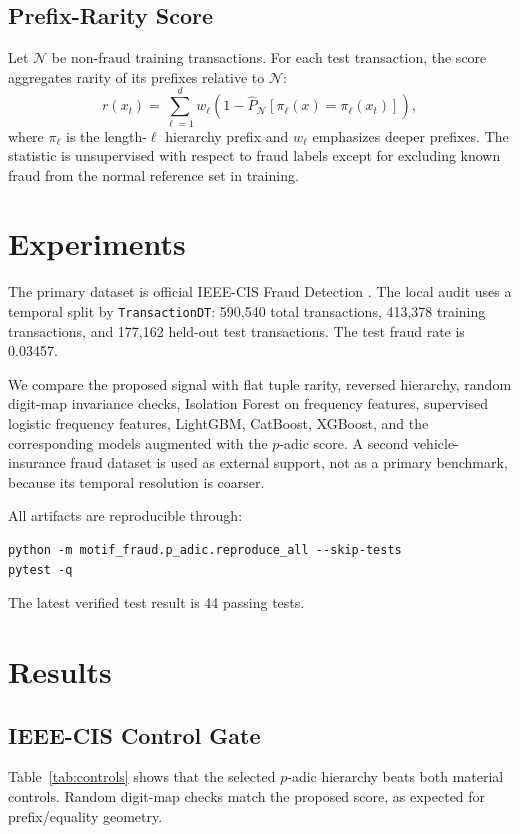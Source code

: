 \documentclass[journal]{IEEEtran}
\begin{document}
\subsection{Prefix-Rarity Score}
Let $\mathcal{N}$ be non-fraud training transactions. For each test transaction, the score aggregates rarity of its prefixes relative to $\mathcal{N}$:
\begin{equation}
  r(x_t)=\sum_{\ell=1}^{d} w_\ell\left(1-\hat{P}_{\mathcal{N}}[\pi_\ell(x)=\pi_\ell(x_t)]\right),
\end{equation}
where $\pi_\ell$ is the length-$\ell$ hierarchy prefix and $w_\ell$ emphasizes deeper prefixes. The statistic is unsupervised with respect to fraud labels except for excluding known fraud from the normal reference set in training.

\section{Experiments}
The primary dataset is official IEEE-CIS Fraud Detection \cite{ieeecis2019}. The local audit uses a temporal split by \texttt{TransactionDT}: 590,540 total transactions, 413,378 training transactions, and 177,162 held-out test transactions. The test fraud rate is 0.03457.

We compare the proposed signal with flat tuple rarity, reversed hierarchy, random digit-map invariance checks, Isolation Forest on frequency features, supervised logistic frequency features, LightGBM, CatBoost, XGBoost, and the corresponding models augmented with the $p$-adic score. A second vehicle-insurance fraud dataset \cite{vehicleclaimkaggle} is used as external support, not as a primary benchmark, because its temporal resolution is coarser.

All artifacts are reproducible through:
\begin{verbatim}
python -m motif_fraud.p_adic.reproduce_all --skip-tests
pytest -q
\end{verbatim}
The latest verified test result is 44 passing tests.

\section{Results}
\subsection{IEEE-CIS Control Gate}
Table~\ref{tab:controls} shows that the selected $p$-adic hierarchy beats both material controls. Random digit-map checks match the proposed score, as expected for prefix/equality geometry.
\end{document}
